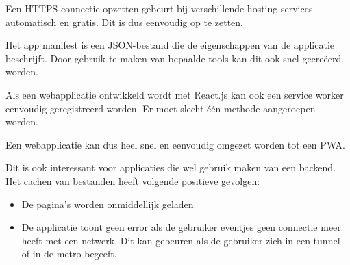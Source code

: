 	Een HTTPS-connectie opzetten gebeurt bij verschillende hosting services automatisch en gratis. Dit is dus eenvoudig op te zetten.
	
	Het app manifest is een JSON-bestand die de eigenschappen van de applicatie beschrijft. Door gebruik te maken van bepaalde tools kan dit ook snel gecreëerd worden.
	
	Als een webapplicatie ontwikkeld wordt met React.js kan ook een service worker eenvoudig geregistreerd worden. Er moet slecht één methode aangeroepen worden.
	
	Een webapplicatie kan dus heel snel en eenvoudig omgezet worden tot een PWA.
	
	Dit is ook interessant voor applicaties die wel gebruik maken van een backend. Het cachen van bestanden heeft volgende positieve gevolgen:
	\begin{itemize}
		\item De pagina's worden onmiddellijk geladen
		\item De applicatie toont geen error als de gebruiker eventjes geen connectie meer heeft met een netwerk. Dit kan gebeuren als de gebruiker zich in een tunnel of in de metro begeeft.
	\end{itemize}	
	
